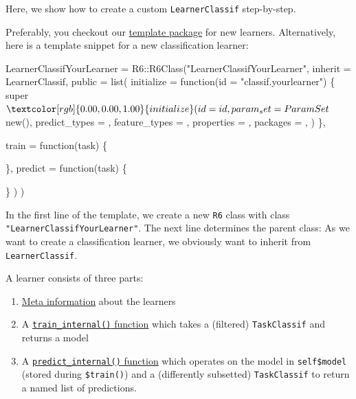 \documentclass[
  11pt,
  parskip=half,
  DIV=calc,
  BCOR=10mm,
  x11names]{scrbook}
\newenvironment{Shaded}{}{}
\newcommand{\ControlFlowTok}[1]{\textcolor[rgb]{0.00,0.00,1.00}{#1}}
\newcommand{\DataTypeTok}[1]{#1}
\newcommand{\KeywordTok}[1]{\textcolor[rgb]{0.00,0.00,1.00}{#1}}
\newcommand{\NormalTok}[1]{#1}
\newcommand{\OperatorTok}[1]{#1}
\newcommand{\StringTok}[1]{\textcolor[rgb]{0.00,0.50,0.50}{#1}}
\providecommand{\tightlist}{%
  \setlength{\itemsep}{0pt}\setlength{\parskip}{0pt}}
\begin{document}
Here, we show how to create a custom \texttt{LearnerClassif} step-by-step.

Preferably, you checkout our \href{https://github.com/mlr-org/mlr3learnertemplate}{template package} for new learners.
Alternatively, here is a template snippet for a new classification learner:

\begin{Shaded}
\begin{Highlighting}[]
\NormalTok{LearnerClassifYourLearner =}\StringTok{ }\NormalTok{R6}\OperatorTok{::}\KeywordTok{R6Class}\NormalTok{(}\StringTok{"LearnerClassifYourLearner"}\NormalTok{,}
  \DataTypeTok{inherit =}\NormalTok{ LearnerClassif,}
  \DataTypeTok{public =} \KeywordTok{list}\NormalTok{(}
    \DataTypeTok{initialize =} \ControlFlowTok{function}\NormalTok{(}\DataTypeTok{id =} \StringTok{"classif.yourlearner"}\NormalTok{) \{}
\NormalTok{      super}\OperatorTok{$}\KeywordTok{initialize}\NormalTok{(}
        \DataTypeTok{id =}\NormalTok{ id,}
        \DataTypeTok{param_set =}\NormalTok{ ParamSet}\OperatorTok{$}\KeywordTok{new}\NormalTok{(),}
        \DataTypeTok{predict_types =}\NormalTok{ ,}
        \DataTypeTok{feature_types =}\NormalTok{ ,}
        \DataTypeTok{properties =}\NormalTok{ ,}
        \DataTypeTok{packages =}\NormalTok{ ,}
\NormalTok{      )}
\NormalTok{    \},}

    \DataTypeTok{train =} \ControlFlowTok{function}\NormalTok{(task) \{}

\NormalTok{    \},}
    \DataTypeTok{predict =} \ControlFlowTok{function}\NormalTok{(task) \{}

\NormalTok{    \}}
\NormalTok{  )}
\NormalTok{)}
\end{Highlighting}
\end{Shaded}

In the first line of the template, we create a new \texttt{R6} class with class \texttt{"LearnerClassifYourLearner"}.
The next line determines the parent class:
As we want to create a classification learner, we obviously want to inherit from \texttt{LearnerClassif}.

A learner consists of three parts:

\begin{enumerate}
\def\labelenumi{\arabic{enumi}.}
\tightlist
\item
  \protect\hyperlink{learner-meta-information}{Meta information} about the learners
\item
  A \protect\hyperlink{learner-train}{\texttt{train\_internal()} function} which takes a (filtered) \texttt{TaskClassif} and returns a model
\item
  A \protect\hyperlink{learner-predict}{\texttt{predict\_internal()} function} which operates on the model in \texttt{self\$model} (stored during \texttt{\$train()}) and a (differently subsetted) \texttt{TaskClassif} to return a named list of predictions.
\end{enumerate}
\end{document}
